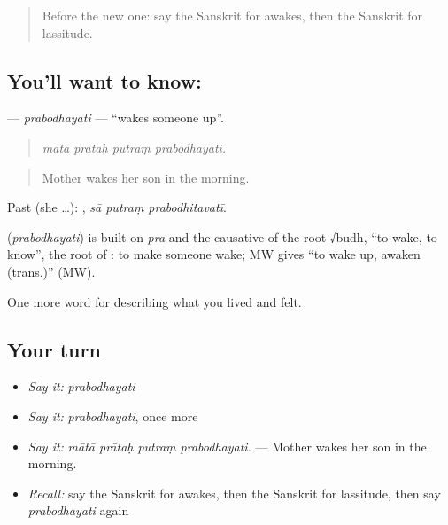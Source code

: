 \label{lesson:SA-C488-prabodhayati}



\begin{quote}
Before the new one: say the Sanskrit for awakes, then the Sanskrit for lassitude.
\end{quote}

\subsection*{You'll want to know: }
\textbf{} — \emph{prabodhayati} — \textquotedblleft{}wakes someone up\textquotedblright{}.

\begin{quote}
   
\end{quote}

\begin{quote}
\emph{mātā prātaḥ putraṃ prabodhayati.}
\end{quote}

\begin{quote}
Mother wakes her son in the morning.
\end{quote}

Past (she …):   , \emph{sā putraṃ prabodhitavatī}.

\begin{cousinweb}
\textbf{} (\emph{prabodhayati}) is built on \emph{pra} and the causative of the root √budh, \textquotedblleft{}to wake, to know\textquotedblright{}, the root of \textbf{}: to make someone wake; MW gives \textquotedblleft{}to wake up, awaken (trans.)\textquotedblright{} (MW).
\end{cousinweb}

\begin{grammarlens}[title={What you've built}]
One more word for describing what you lived and felt.
\end{grammarlens}

\subsection*{Your turn}
\begin{itemize}
\raggedright
  \item \emph{Say it:} \emph{prabodhayati}
  \item \emph{Say it:} \emph{prabodhayati}, once more
  \item \emph{Say it:} \emph{mātā prātaḥ putraṃ prabodhayati.} — Mother wakes her son in the morning.
  \item \emph{Recall:} say the Sanskrit for awakes, then the Sanskrit for lassitude, then say \emph{prabodhayati} again
\end{itemize}


